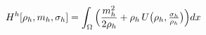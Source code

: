 \documentclass[preview]{standalone}
\begin{document}
\begin{align*}
\special{dvisvgm:raw <g id='unique000'>}H^h[\rho_h,m_h,\sigma_h]=\int_\Omega\Big(\frac{m_h^2}{2\rho_h}+\rho_h\,U\big(\rho_h,\tfrac{\sigma_h}{\rho_h}\big)\Big)dx\special{dvisvgm:raw </g>}
\end{align*}
\end{document}
